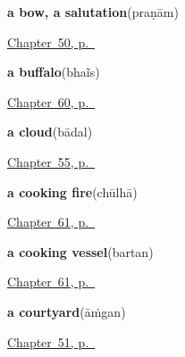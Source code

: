 \noindent\begin{minipage}[t]{\linewidth}
\raggedright
\textbf{a bow, a salutation}\enspace\emph{}\enspace(praṇām)\par
\footnotesize \hyperref[ch:hi-courtesy]{Chapter~50, p.~\pageref*{ch:hi-courtesy}}
\end{minipage}\par\smallskip

\noindent\begin{minipage}[t]{\linewidth}
\raggedright
\textbf{a buffalo}\enspace\emph{}\enspace(bhaĩs)\par
\footnotesize \hyperref[ch:hi-animals-in-the-yard]{Chapter~60, p.~\pageref*{ch:hi-animals-in-the-yard}}
\end{minipage}\par\smallskip

\noindent\begin{minipage}[t]{\linewidth}
\raggedright
\textbf{a cloud}\enspace\emph{}\enspace(bādal)\par
\footnotesize \hyperref[ch:hi-the-sky]{Chapter~55, p.~\pageref*{ch:hi-the-sky}}
\end{minipage}\par\smallskip

\noindent\begin{minipage}[t]{\linewidth}
\raggedright
\textbf{a cooking fire}\enspace\emph{}\enspace(chūlhā)\par
\footnotesize \hyperref[ch:hi-at-the-cooking-fire]{Chapter~61, p.~\pageref*{ch:hi-at-the-cooking-fire}}
\end{minipage}\par\smallskip

\noindent\begin{minipage}[t]{\linewidth}
\raggedright
\textbf{a cooking vessel}\enspace\emph{}\enspace(bartan)\par
\footnotesize \hyperref[ch:hi-at-the-cooking-fire]{Chapter~61, p.~\pageref*{ch:hi-at-the-cooking-fire}}
\end{minipage}\par\smallskip

\noindent\begin{minipage}[t]{\linewidth}
\raggedright
\textbf{a courtyard}\enspace\emph{}\enspace(āṁgan)\par
\footnotesize \hyperref[ch:hi-welcoming-a-guest]{Chapter~51, p.~\pageref*{ch:hi-welcoming-a-guest}}
\end{minipage}\par\smallskip

